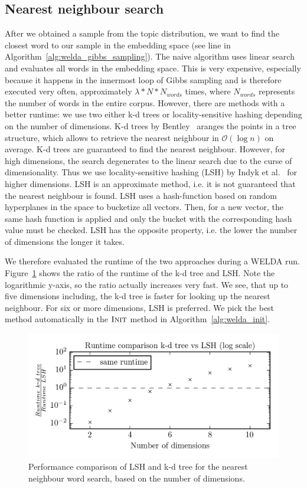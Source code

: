\documentclass[
        a4paper,
        titlepage,
        twoside,
        parskip
        ]{scrbook}
\theoremstyle{break}
\begin{document}
\subsection{Nearest neighbour search}
After we obtained a sample from the topic distribution, we want to find the closest word to our sample in the embedding space (see line in Algorithm~\ref{alg:welda_gibbs_sampling}).
The naive algorithm uses linear search and evaluates all words in the embedding space.
This is very expensive, especially because it happens in the innermost loop of Gibbs sampling and is therefore executed very often, approximately $\lambda * N * N_{words}$ times, where $N_{words}$ represents the number of words in the entire corpus.
However, there are methods with a better runtime: we use two either k-d trees or locality-sensitive hashing depending on the number of dimensions.
K-d trees by Bentley~\cite{Bentley1975} aranges the points in a tree structure, which allows to retrieve the nearest neighbour in $\mathcal{O}(\log n)$ on average.
K-d trees are guaranteed to find the nearest neighbour.
However, for high dimensions, the search degenerates to the linear search due to the curse of dimensionality.
Thus we use locality-sensitive hashing (LSH) by Indyk et al.~\cite{Indyk1998} for higher dimensions.
LSH is an approximate method, i.e. it is not guaranteed that the nearest neighbour is found.
LSH uses a hash-function based on random hyperplanes in the space to bucketize all vectors.
Then, for a new vector, the same hash function is applied and only the bucket with the corresponding hash value must be checked.
LSH has the opposite property, i.e. the lower the number of dimensions the longer it takes.

We therefore evaluated the runtime of the two approaches during a WELDA run.
Figure~\ref{fig:lsh_vs_kdtree} shows the ratio of the runtime of the k-d tree and LSH.
Note the logarithmic y-axis, so the ratio actually increases very fast.
We see, that up to five dimensions including, the k-d tree is faster for looking up the nearest neighbour.
For six or more dimensions, LSH is preferred.
We pick the best method automatically in the $\textsc{Init}$ method in Algorithm~\ref{alg:welda_init}.
\begin{figure}
       \centering
       \includegraphics[width=12cm]{figures/lsh_vs_kdtree.png}
       \caption{Performance comparison of LSH and k-d tree for the nearest neighbour word search, based on the number of dimensions.}
       \label{fig:lsh_vs_kdtree}
\end{figure}
\end{document}
